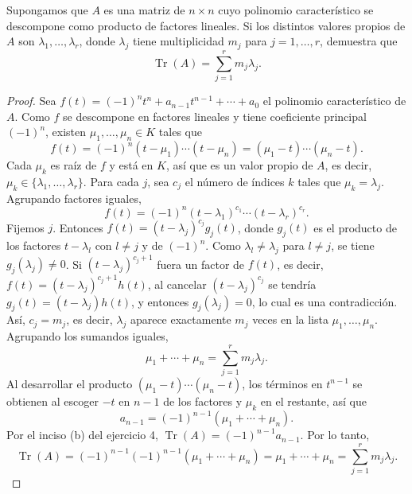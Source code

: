 \documentclass[12pt,a4paper]{article}
\renewcommand{\Tr}{\operatorname{Tr}}
\begin{document}
    \begin{problema}
        Supongamos que $A$ es una matriz de $n\times n$ cuyo polinomio característico se descompone como producto de factores lineales. Si los distintos valores propios de $A$ son $\lambda_{1},\dots,\lambda_{r}$, donde $\lambda_{j}$ tiene multiplicidad $m_{j}$ para $j=1,\dots,r$, demuestra que
        \begin{equation*}
            \Tr(A)=\sum_{j=1}^{r}m_{j}\lambda_{j}.
        \end{equation*}
    \end{problema}

    \begin{proof}
        Sea $f(t)=(-1)^{n}t^{n}+a_{n-1}t^{n-1}+\cdots+a_{0}$ el polinomio característico de $A$. Como $f$ se descompone en factores lineales y tiene coeficiente principal $(-1)^{n}$, existen $\mu_{1},\dots,\mu_{n}\in K$ tales que
        \begin{equation*}
            f(t)=(-1)^{n}(t-\mu_{1})\cdots(t-\mu_{n})=(\mu_{1}-t)\cdots(\mu_{n}-t).
        \end{equation*}
        Cada $\mu_{k}$ es raíz de $f$ y está en $K$, así que es un valor propio de $A$, es decir, $\mu_{k}\in\{\lambda_{1},\dots,\lambda_{r}\}$. Para cada $j$, sea $c_{j}$ el número de índices $k$ tales que $\mu_{k}=\lambda_{j}$. Agrupando factores iguales,
        \begin{equation*}
            f(t)=(-1)^{n}(t-\lambda_{1})^{c_{1}}\cdots(t-\lambda_{r})^{c_{r}}.
        \end{equation*}
        Fijemos $j$. Entonces $f(t)=(t-\lambda_{j})^{c_{j}}g_{j}(t)$, donde $g_{j}(t)$ es el producto de los factores $t-\lambda_{l}$ con $l\neq j$ y de $(-1)^{n}$. Como $\lambda_{l}\neq\lambda_{j}$ para $l\neq j$, se tiene $g_{j}(\lambda_{j})\neq0$. Si $(t-\lambda_{j})^{c_{j}+1}$ fuera un factor de $f(t)$, es decir, $f(t)=(t-\lambda_{j})^{c_{j}+1}h(t)$, al cancelar $(t-\lambda_{j})^{c_{j}}$ se tendría $g_{j}(t)=(t-\lambda_{j})h(t)$, y entonces $g_{j}(\lambda_{j})=0$, lo cual es una contradicción. Así, $c_{j}=m_{j}$, es decir, $\lambda_{j}$ aparece exactamente $m_{j}$ veces en la lista $\mu_{1},\dots,\mu_{n}$. Agrupando los sumandos iguales,
        \begin{equation*}
            \mu_{1}+\cdots+\mu_{n}=\sum_{j=1}^{r}m_{j}\lambda_{j}.
        \end{equation*}
        Al desarrollar el producto $(\mu_{1}-t)\cdots(\mu_{n}-t)$, los términos en $t^{n-1}$ se obtienen al escoger $-t$ en $n-1$ de los factores y $\mu_{k}$ en el restante, así que
        \begin{equation*}
            a_{n-1}=(-1)^{n-1}(\mu_{1}+\cdots+\mu_{n}).
        \end{equation*}
        Por el inciso (b) del ejercicio 4, $\Tr(A)=(-1)^{n-1}a_{n-1}$. Por lo tanto,
        \begin{equation*}
            \Tr(A)=(-1)^{n-1}(-1)^{n-1}(\mu_{1}+\cdots+\mu_{n})=\mu_{1}+\cdots+\mu_{n}=\sum_{j=1}^{r}m_{j}\lambda_{j}.
        \end{equation*}
    \end{proof}
\end{document}
